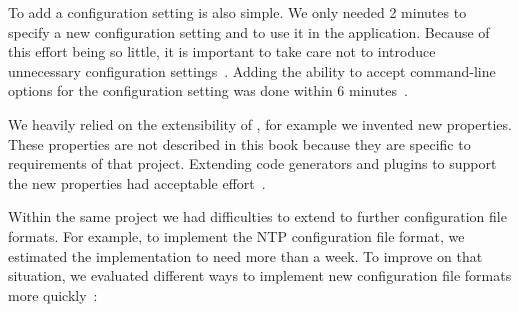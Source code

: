 To add a configuration setting is also simple.
We only needed 2 minutes to specify a new configuration setting and to use it in the application.
Because of this effort being so little, it is important to take care not to introduce unnecessary configuration settings~\cite{xu2015hey}.
Adding the ability to accept command-line options for the configuration setting was done within 6 minutes~\cite{raab2015kps}.

We heavily relied on the extensibility of \elektra{}, for example we invented new properties.
These properties are not described in this book because they are specific to requirements of that project.
Extending code generators and plugins to support the new properties had acceptable effort~\cite{raab2015kps}.


Within the same project we had difficulties to extend \elektra{} to further configuration file formats.
For example, to implement the NTP configuration file format, we estimated the implementation to need more than a week.
To improve on that situation, we evaluated different ways to implement new configuration file formats more quickly~\cite{raab2015kps}:


